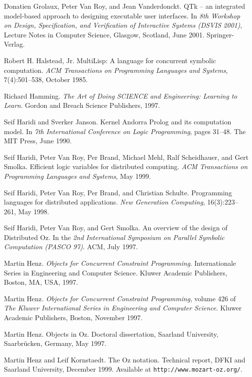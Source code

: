 \begin{thebibliography}{213}
Donatien Grolaux, Peter Van Roy, and Jean Vanderdonckt. QTk – an integrated model-based approach to designing executable user interfaces. In \emph{8th Workshop on Design, Specification, and Verification of Interactive Systems (DSVIS 2001)}, Lecture Notes in Computer Science, Glasgow, Scotland, June 2001. Springer-Verlag.

Robert H. Halstead, Jr. MultiLisp: A language for concurrent symbolic computation. \emph{ACM Transactions on Programming Languages and Systems}, 7(4):501–538, October 1985.

Richard Hamming. \emph{The Art of Doing SCIENCE and Engineering: Learning to Learn}. Gordon and Breach Science Publishers, 1997.

Seif Haridi and Sverker Janson. Kernel Andorra Prolog and its computation model. In \emph{7th International Conference on Logic Programming}, pages 31–48. The MIT Press, June 1990.

Seif Haridi, Peter Van Roy, Per Brand, Michael Mehl, Ralf Scheidhauer, and Gert Smolka. Efficient logic variables for distributed computing. \emph{ACM Transactions on Programming Languages and Systems}, May 1999.

Seif Haridi, Peter Van Roy, Per Brand, and Christian Schulte. Programming languages for distributed applications. \emph{New Generation Computing}, 16(3):223–261, May 1998.

Seif Haridi, Peter Van Roy, and Gert Smolka. An overview of the design of Distributed Oz. In the \emph{2nd International Symposium on Parallel Symbolic Computation (PASCO 97)}. ACM, July 1997.

Martin Henz. \emph{Objects for Concurrent Constraint Programming}. Internationale Series in Engineering and Computer Science. Kluwer Academic Publishers, Boston, MA, USA, 1997.

Martin Henz. \emph{Objects for Concurrent Constraint Programming}, volume 426 of \emph{The Kluwer International Series in Engineering and Computer Science}. Kluwer Academic Publishers, Boston, November 1997.

Martin Henz. Objects in Oz. Doctoral dissertation, Saarland University, Saarbr\"ucken, Germany, May 1997.

Martin Henz and Leif Kornstaedt. The Oz notation. Technical report, DFKI and Saarland University, December 1999. Available at \verb"http://www.mozart-oz.org/".


\end{thebibliography}
